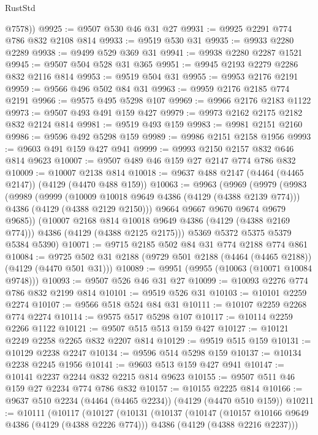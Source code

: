 \begin{lexlean}{RustStd}
\begin{coremodule}
        @7578))
@9925 := @9507 @530 @46 @31 @27
@9931 := @9925 @2291 @774 @786 @832 @2108 @814
@9933 := @9519 @530 @31
@9935 := @9933 @2280 @2289
@9938 := @9499 @529 @369 @31
@9941 := @9938 @2280 @2287 @1521
@9945 := @9507 @504 @528 @31 @365
@9951 := @9945 @2193 @2279 @2286 @832 @2116 @814
@9953 := @9519 @504 @31
@9955 := @9953 @2176 @2191
@9959 := @9566 @496 @502 @84 @31
@9963 := @9959 @2176 @2185 @774 @2191
@9966 := @9575 @495 @5298 @107
@9969 := @9966 @2176 @2183 @1122
@9973 := @9507 @493 @491 @159 @427
@9979 := @9973 @2162 @2175 @2182 @832 @2124 @814
@9981 := @9519 @493 @159
@9983 := @9981 @2151 @2160
@9986 := @9596 @492 @5298 @159
@9989 := @9986 @2151 @2158 @1956
@9993 := @9603 @491 @159 @427 @941
@9999 := @9993 @2150 @2157 @832 @646 @814 @9623
@10007 := @9507 @489 @46 @159 @27 @2147 @774 @786 @832
@10009 := @10007 @2138 @814
@10018 := @9637 @488 @2147 (@4464 (@4465 @2147)) (@4129 (@4470 @488 @159))
@10063 := @9963
    (@9969
      (@9979
        (@9983
          (@9989
            (@9999
              (@10009 @10018 @9649 @4386 (@4129 (@4388 @2139 @774)))
              @4386
              (@4129 (@4388 @2129 @2150)))
            @9664
            @9667
            @9670
            @9674
            @9679
            @9685))
        (@10007 @2168 @814 @10018 @9649 @4386 (@4129 (@4388 @2169 @774)))
        @4386
        (@4129 (@4388 @2125 @2175)))
      @5369
      @5372
      @5375
      @5379
      @5384
      @5390)
@10071 := @9715 @2185 @502 @84 @31 @774 @2188 @774 @861
@10084 := @9725 @502 @31 @2188 (@9729 @501 @2188 (@4464 (@4465 @2188)) (@4129 (@4470 @501 @31)))
@10089 := @9951 (@9955 (@10063 (@10071 @10084 @9748)))
@10093 := @9507 @526 @46 @31 @27
@10099 := @10093 @2276 @774 @786 @832 @2199 @814
@10101 := @9519 @526 @31
@10103 := @10101 @2259 @2274
@10107 := @9566 @518 @524 @84 @31
@10111 := @10107 @2259 @2268 @774 @2274
@10114 := @9575 @517 @5298 @107
@10117 := @10114 @2259 @2266 @1122
@10121 := @9507 @515 @513 @159 @427
@10127 := @10121 @2249 @2258 @2265 @832 @2207 @814
@10129 := @9519 @515 @159
@10131 := @10129 @2238 @2247
@10134 := @9596 @514 @5298 @159
@10137 := @10134 @2238 @2245 @1956
@10141 := @9603 @513 @159 @427 @941
@10147 := @10141 @2237 @2244 @832 @2215 @814 @9623
@10155 := @9507 @511 @46 @159 @27 @2234 @774 @786 @832
@10157 := @10155 @2225 @814
@10166 := @9637 @510 @2234 (@4464 (@4465 @2234)) (@4129 (@4470 @510 @159))
@10211 := @10111
    (@10117
      (@10127
        (@10131
          (@10137
            (@10147
              (@10157 @10166 @9649 @4386 (@4129 (@4388 @2226 @774)))
              @4386
              (@4129 (@4388 @2216 @2237)))

\end{coremodule}
\end{lexlean}
